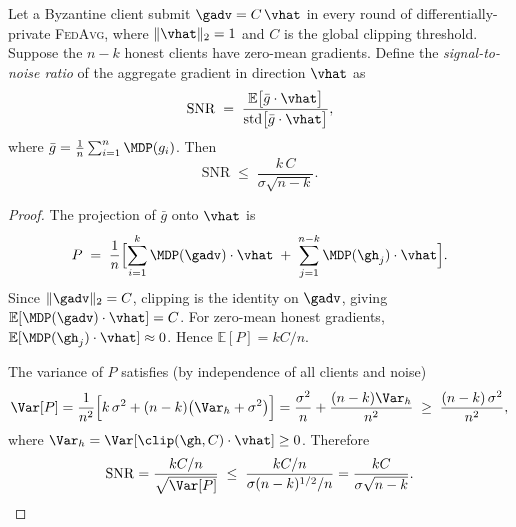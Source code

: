 %
%


\begin{theorem}
\label{thm:snr-upper}
Let a Byzantine client submit $\gadv = C\,\vhat$ in every round of
differentially-private \textsc{FedAvg}, where $\|\vhat\|_2=1$ and $C$ is
the global clipping threshold.  Suppose the $n-k$ honest clients have
zero-mean gradients.  Define the \emph{signal-to-noise ratio} of the
aggregate gradient in direction $\vhat$ as
\[
  \mathrm{SNR} \;=\; \frac{\mathbb{E}\bigl[\bar{g}\cdot\vhat\bigr]}
                          {\mathrm{std}\bigl[\bar{g}\cdot\vhat\bigr]},
\]
where $\bar{g} = \frac{1}{n}\sum_{i=1}^n \MDP(g_i)$.
Then
\[
  \boxed{\mathrm{SNR} \;\le\; \frac{k\,C}{\sigma\sqrt{n-k}}.}
\]

\begin{proof}
The projection of $\bar{g}$ onto $\vhat$ is
\[
  P \;=\; \frac{1}{n}\Bigl[
    \sum_{i=1}^{k} \MDP(\gadv)\cdot\vhat
    \;+\; \sum_{j=1}^{n-k} \MDP(\gh_j)\cdot\vhat
  \Bigr].
\]
Since $\|\gadv\|_2 = C$, clipping is the identity on $\gadv$, giving
$\mathbb{E}[\MDP(\gadv)\cdot\vhat] = C$.  For zero-mean honest gradients,
$\mathbb{E}[\MDP(\gh_j)\cdot\vhat]\approx 0$.  Hence $\mathbb{E}[P] = kC/n$.

The variance of $P$ satisfies (by independence of all clients and noise)
\[
  \Var[P]
    = \frac{1}{n^2}\Bigl[k\,\sigma^2 + (n-k)\bigl(\Var_h+\sigma^2\bigr)\Bigr]
    = \frac{\sigma^2}{n} + \frac{(n-k)\Var_h}{n^2}
    \;\ge\; \frac{(n-k)\,\sigma^2}{n^2},
\]
where $\Var_h = \Var[\clip(\gh,C)\cdot\vhat]\ge 0$.  Therefore
\[
  \mathrm{SNR}
  = \frac{kC/n}{\sqrt{\Var[P]}}
  \;\le\; \frac{kC/n}{\sigma(n-k)^{1/2}/n}
  = \frac{kC}{\sigma\sqrt{n-k}}.\qedhere
\]
\end{proof}
\end{theorem}

